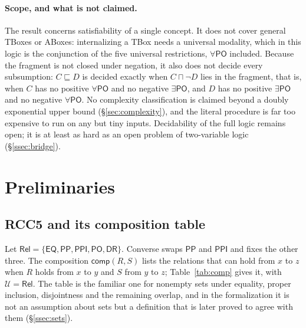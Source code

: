 \documentclass[11pt]{article}
\newcommand{\DR}{\mathsf{DR}}
\newcommand{\PO}{\mathsf{PO}}
\newcommand{\PP}{\mathsf{PP}}
\newcommand{\PPI}{\mathsf{PPI}}
\newcommand{\EQ}{\mathsf{EQ}}
\newcommand{\Rel}{\mathsf{Rel}}
\newcommand{\comp}{\mathsf{comp}}
\theoremstyle{plain}
\theoremstyle{definition}
\begin{document}
\paragraph{Scope, and what is not claimed.} The result concerns satisfiability
of a single concept. It does not cover general TBoxes or ABoxes: internalizing a
TBox needs a universal modality, which in this logic is the conjunction of the
five universal restrictions, $\forall\PO$ included. Because the fragment is not
closed under negation, it also does not decide every subsumption: $C\sqsubseteq
D$ is decided exactly when $C\sqcap\neg D$ lies in the fragment, that is, when
$C$ has no positive $\forall\PO$ and no negative $\exists\PO$, and $D$ has no
positive $\exists\PO$ and no negative $\forall\PO$. No complexity
classification is claimed beyond a doubly exponential upper bound
(\S\ref{sec:complexity}), and the literal procedure is far too expensive to
run on any but tiny inputs. Decidability of the full logic remains open; it
is at least as hard as an open problem of two-variable logic
(\S\ref{ssec:bridge}).

\section{Preliminaries}
\label{sec:prelim}

\subsection{RCC5 and its composition table}

Let $\Rel=\{\EQ,\PP,\PPI,\PO,\DR\}$. Converse swaps $\PP$ and $\PPI$ and fixes
the other three. The composition $\comp(R,S)$ lists the relations that can hold
from $x$ to $z$ when $R$ holds from $x$ to $y$ and $S$ from $y$ to $z$;
Table~\ref{tab:comp} gives it, with $\mathcal U=\Rel$. The table is the
familiar one for nonempty sets under equality, proper inclusion, disjointness
and the remaining overlap, and in the formalization it is not an assumption
about sets but a definition that is later proved to agree with them
(\S\ref{ssec:sets}).
\end{document}

